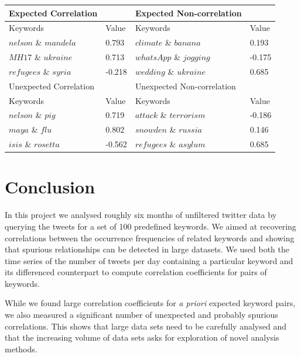 \documentclass[12pt, a4paper]{article}
\begin{document}
\begin{minipage}{\linewidth}
	\centering
	\label{tab:example_corr} 
	\begin{tabular}{ | l | l || l | l |}
		\hline
		Expected Correlation &  & Expected Non-correlation & \\ \hline
		Keywords & Value & Keywords & Value \\ \hline
		$nelson$ \& $mandela$ & 0.793 & $climate$ \& $banana$ & 0.193\\
		$MH17$ \& $ukraine$ & 0.713 & $whatsApp$ \& $jogging$ & -0.175\\
		$refugees$ \& $syria$ & -0.218 & $wedding$ \& $ukraine$ & 0.685\\ \hline \hline
		
		Unexpected Correlation &  & Unexpected Non-correlation & \\ \hline
		Keywords & Value & Keywords & Value \\ \hline
		$nelson$ \& $pig$ & 0.719 & $attack$ \& $terrorism$ & -0.186\\
		$maya$ \& $flu$ & 0.802 & $snowden$ \& $russia$ &  0.146\\
		$isis$ \& $rosetta$ & -0.562 & $refugees$ \& $asylum$ & 0.685\\ \hline
	\end{tabular}
\end{minipage}


\section{Conclusion}
In this project we analysed roughly six months of unfiltered twitter data by querying the tweets for a set of 100 predefined keywords. We aimed at recovering correlations between the occurrence frequencies of related keywords and showing that spurious relationships can be detected in large datasets. We used both the time series of the number of tweets per day containing a particular keyword and its differenced counterpart to compute correlation coefficients for pairs of keywords. 

While we found large correlation coefficients for \textit{a priori} expected keyword pairs, we also measured a significant number of unexpected and probably spurious correlations. This shows that large data sets need to be carefully analysed and that the increasing volume of data sets asks for exploration of novel analysis methods.
\end{document}
